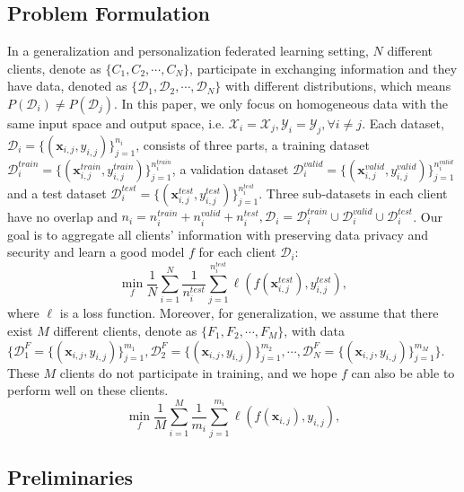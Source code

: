 \documentclass[11pt]{article}
\begin{document}
\subsection{Problem Formulation}
In a generalization and personalization federated learning setting, $N$ different clients, denote as $\{C_1, C_2, \cdots, C_N\}$, participate in exchanging information and they have data, denoted as $\{ \mathcal{D}_1, \mathcal{D}_2, \cdots, \mathcal{D}_N \}$ with different distributions, which means $P(\mathcal{D}_i) \neq P(\mathcal{D}_j)$.
In this paper, we only focus on homogeneous data with the same input space and output space, i.e. $\mathcal{X}_i = \mathcal{X}_j, \mathcal{Y}_i = \mathcal{Y}_j, \forall i\neq j$.
Each dataset, $\mathcal{D}_i = \{ (\mathbf{x}_{i,j}, y_{i,j}) \}_{j=1}^{n_i}$, consists of three parts, a training dataset $\mathcal{D}_i^{train} = \{ (\mathbf{x}_{i,j}^{train}, y_{i,j}^{train}) \}_{j=1}^{n_i^{train}}$, a validation dataset $\mathcal{D}_i^{valid} = \{ (\mathbf{x}_{i,j}^{valid}, y_{i,j}^{valid}) \}_{j=1}^{n_i^{valid}}$ and a test dataset $\mathcal{D}_i^{test} = \{ (\mathbf{x}_{i,j}^{test}, y_{i,j}^{test}) \}_{j=1}^{n_i^{test}}$.
Three sub-datasets in each client have no overlap and $n_i = n_i^{train} + n_i^{valid} + n_i^{test}, \mathcal{D}_i = \mathcal{D}_i^{train} \cup \mathcal{D}_i^{valid} \cup \mathcal{D}_i^{test}$.
Our goal is to aggregate all clients' information with preserving data privacy and security and learn a good model $f$ for each client $\mathcal{D}_i$:
\begin{equation}
    \min_{f} \frac{1}{N} \sum_{i=1}^N \frac{1}{n_{i}^{test}} \sum_{j=1}^{n_i^{test}} \ell(f(\mathbf{x}_{i,j}^{test}), y_{i,j}^{test}),
    \label{eqa:goal1}
\end{equation}
where $\ell$ is a loss function.
Moreover, for generalization, we assume that there exist $M$ different clients, denote as $\{F_1, F_2, \cdots, F_M\}$, with data $\{ \mathcal{D}_1^F =\{ (\mathbf{x}_{i,j}, y_{i,j}) \}_{j=1}^{m_1},  \mathcal{D}_2^F= \{ (\mathbf{x}_{i,j}, y_{i,j}) \}_{j=1}^{m_2}, \cdots, \mathcal{D}_N^F=\{ (\mathbf{x}_{i,j}, y_{i,j}) \}_{j=1}^{m_M} \}$.
These $M$ clients do not participate in training, and we hope $f$ can also be able to perform well on these clients.
\begin{equation}
    \min_{f} \frac{1}{M} \sum_{i=1}^M \frac{1}{m_{i}} \sum_{j=1}^{m_i} \ell(f(\mathbf{x}_{i,j}), y_{i,j}),
    \label{eqa:goal2}
\end{equation}

\subsection{Preliminaries}
\end{document}
